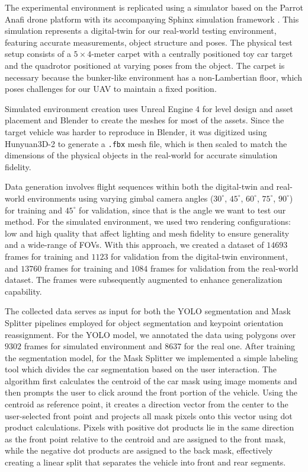 \documentclass[10pt,twocolumn,letterpaper]{article}
\begin{document}
The experimental environment is replicated using a simulator based on the Parrot Anafi drone platform with its accompanying Sphinx simulation framework \cite{WhatisPa31:online}. This simulation represents a digital-twin for our real-world testing environment, featuring accurate measurements, object structure and poses. The physical test setup consists of a $5\times4$-meter carpet with a centrally positioned toy car target and the quadrotor positioned at varying poses from the object. The carpet is necessary because the bunker-like environment has a non-Lambertian floor, which poses challenges for our UAV to maintain a fixed position. 

Simulated environment creation uses Unreal Engine 4 for level design and asset placement and Blender \cite{blender2024} to create the meshes for most of the assets. Since the target vehicle was harder to reproduce in Blender, it was digitized using Hunyuan3D-2 \cite{zhao2025hunyuan3d20scalingdiffusion} to generate a \texttt{.fbx} mesh file, which is then scaled to match the dimensions of the physical objects in the real-world for accurate simulation fidelity.

Data generation involves flight sequences within both the digital-twin and real-world environments using varying gimbal camera angles ($30^\circ$, $45^\circ$, $60^\circ$, $75^\circ$, $90^\circ$) for training and $45^\circ$ for validation, since that is the angle we want to test our method. For the simulated environment, we used two rendering configurations: low and high quality that affect lighting and mesh fidelity to ensure generality and a wide-range of FOVs. With this approach, we created a dataset of $14693$ frames for training and $1123$ for validation from the digital-twin environment, and $13760$ frames for training and $1084$ frames for validation from the real-world dataset. The frames were subsequently augmented to enhance generalization capability.

The collected data serves as input for both the YOLO segmentation and Mask Splitter pipelines employed for object segmentation and keypoint orientation reassignment. For the YOLO model, we annotated the data using polygons over $9302$ frames for simulated environment and $8637$ for the real one. After training the segmentation model, for the Mask Splitter we implemented a simple labeling tool which divides the car segmentation based on the user interaction. The algorithm first calculates the centroid of the car mask using image moments and then prompts the user to click around the front portion of the vehicle. Using the centroid as reference point, it creates a direction vector from the center to the user-selected front point and projects all mask pixels onto this vector using dot product calculations. Pixels with positive dot products lie in the same direction as the front point relative to the centroid and are assigned to the front mask, while the negative dot products are assigned to the back mask, effectively creating a linear split that separates the vehicle into front and rear segments.
\end{document}
